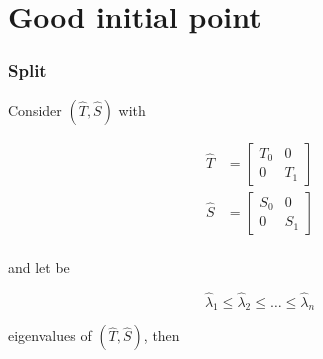 \documentclass{beamer}
\theoremstyle{definition} \newtheorem{de}{Def}
\theoremstyle{remark} \newtheorem{os}[de]{Oss}
\theoremstyle{plain} \newtheorem{te}[de]{Teo}
\theoremstyle{plain} \newtheorem{co}[de]{Cor}
\theoremstyle{plain} \newtheorem{pr}[de]{Prop}
\theoremstyle{plain} \newtheorem{lem}[de]{Lemm}
\theoremstyle{remark} \newtheorem{rem}[de]{Remark}
\begin{document}
\section{Good initial point}

\begin{frame}
\frametitle{Split}

Consider $(\hat T, \hat S)$ with

\begin{align*}
 \hat T &= \begin{bmatrix} T_{0} & 0\\ 0 & T_{1} \end{bmatrix}\\
 \hat S &= \begin{bmatrix} S_{0} & 0\\ 0 & S_{1} \end{bmatrix}\\
\end{align*}

and let be

\begin{equation*}
  \hat\lambda_1 \le \hat\lambda_2 \le \dots \le \hat\lambda_n
\end{equation*}

eigenvalues of $(\hat T, \hat S)$, then

\end{frame}
\end{document}
